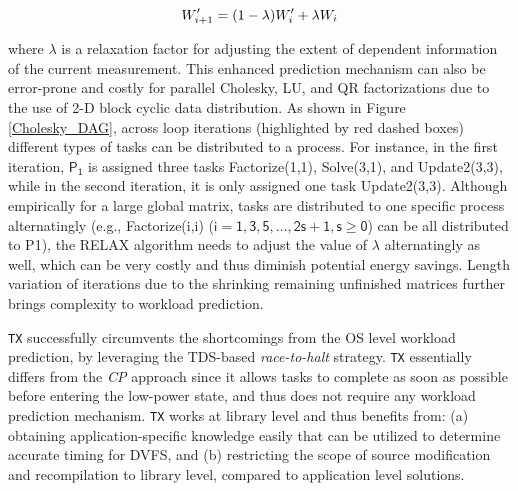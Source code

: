 \documentclass[12pt]{elsarticle}
\begin{document}
\vspace{-5mm}
\begin{equation}
\label{relax_algorithm}
W_{i+1}' = (1 - \lambda) W_i' + \lambda W_i
\vspace{-1mm}
\end{equation}

\noindent where $\lambda$ is a relaxation factor for adjusting the extent of dependent information of the current measurement. This enhanced prediction mechanism can also be error-prone and costly for parallel Cholesky, LU, and QR factorizations due to the use of 2-D block cyclic data distribution. As shown in Figure \ref{Cholesky_DAG}, across loop iterations (highlighted by red dashed boxes) different types of tasks can be distributed to a process. For instance, in the first iteration, $\mathsf{P_1}$ is assigned three tasks \textsf{Factorize(1,1)}, \textsf{Solve(3,1)}, and \textsf{Update2(3,3)}, while in the second iteration, it is only assigned one task \textsf{Update2(3,3)}. Although empirically for a large global matrix, tasks are distributed to one specific process alternatingly (e.g., \textsf{Factorize(i,i)} ($\mathsf{i = 1, 3, 5, \dots, 2s+1, s \geq 0}$) can be all distributed to \textsf{P1}), the RELAX algorithm needs to adjust the value of $\lambda$ alternatingly as well, which can be very costly and thus diminish potential energy savings. Length variation of iterations due to the shrinking remaining unfinished matrices further brings complexity to workload prediction.

\texttt{TX} successfully circumvents the shortcomings from the OS level workload prediction, by leveraging the TDS-based \emph{race-to-halt} strategy. \texttt{TX} essentially differs from the \emph{CP} approach since it allows tasks to complete as soon as possible before entering the low-power state, and thus does not require any workload prediction mechanism. \texttt{TX} works at library level and thus benefits from: (a) obtaining application-specific knowledge easily that can be utilized to determine accurate timing for DVFS, and (b) restricting the scope of source modification and recompilation to library level, compared to application level solutions.
\end{document}
